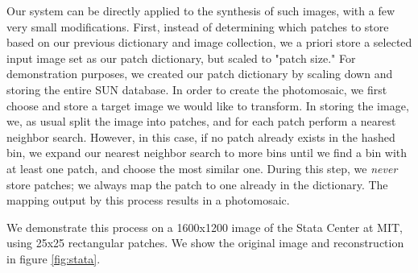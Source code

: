 Our system can be directly applied to the synthesis of such images, with a few very small modifications.  First, instead of determining which patches to store based on our previous dictionary and image collection, we a priori store a selected input image set as our patch dictionary, but scaled to "patch size."  For demonstration purposes, we created our patch dictionary by scaling down and storing the entire SUN database.  In order to create the photomosaic, we first choose and store a target image we would like to transform.  In storing the image, we, as usual split the image into patches, and for each patch perform a nearest neighbor search.  However, in this case, if no patch already exists in the hashed bin, we expand our nearest neighbor search to more bins until we find a bin with at least one patch, and choose the most similar one.  During this step, we \emph{never} store patches; we always map the patch to one already in the dictionary.  The mapping output by this process results in a photomosaic.

We demonstrate this process on a 1600x1200 image of the Stata Center at MIT, using 25x25 rectangular patches.  We show the original image and reconstruction in figure \ref{fig:stata}.


